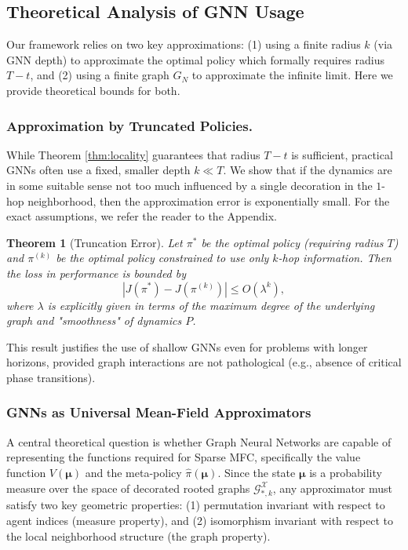 \documentclass{article}
\newtheorem{theorem}{Theorem}
\begin{document}
\subsection{Theoretical Analysis of GNN Usage}
\label{sec:theory_errors}
Our framework relies on two key approximations: (1) using a finite radius $k$ (via GNN depth) to approximate the optimal policy which formally requires radius $T-t$, and (2) using a finite graph $G_N$ to approximate the infinite limit. Here we provide theoretical bounds for both.

\subsubsection{Approximation by Truncated Policies.}
While Theorem \ref{thm:locality} guarantees that radius $T-t$ is sufficient, practical GNNs often use a fixed, smaller depth $k \ll T$. We show that if the dynamics are in some suitable sense not too much influenced by a single decoration in the $1$-hop neighborhood, then the approximation error is exponentially small. For the exact assumptions, we refer the reader to the Appendix.

\begin{theorem}[Truncation Error]
\label{thm:truncation}
Let $\pi^*$ be the optimal policy (requiring radius $T$) and $\pi^{(k)}$ be the optimal policy constrained to use only $k$-hop information. Then the loss in performance is bounded by
\begin{equation}
    |J(\pi^*) - J(\pi^{(k)})| \le O(\lambda^k),
\end{equation}
where $\lambda$ is explicitly given in terms of the maximum degree of the underlying graph and "smoothness" of dynamics $P$.
\end{theorem}
This result justifies the use of shallow GNNs even for problems with longer horizons, provided graph interactions are not pathological (e.g., absence of critical phase transitions).

\subsubsection{GNNs as Universal Mean-Field Approximators}

A central theoretical question is whether Graph Neural Networks are capable of representing the functions required for Sparse MFC, specifically the value function $V(\boldsymbol{\mu})$ and the meta-policy $\hat{\pi}(\boldsymbol{\mu})$. Since the state $\boldsymbol{\mu}$ is a probability measure over the space of decorated rooted graphs $\mathcal{G}_{*,k}^{\mathcal{X}}$, any approximator must satisfy two key geometric properties: (1) permutation invariant with respect to agent indices (measure property), and (2) isomorphism invariant with respect to the local neighborhood structure (the graph property).
\end{document}
